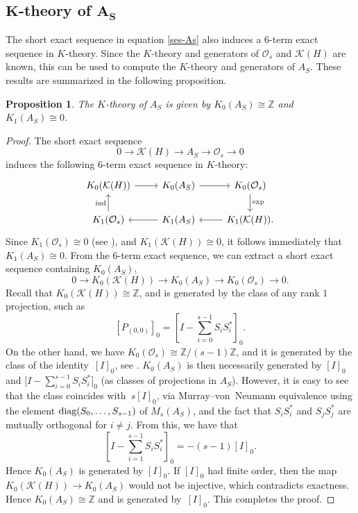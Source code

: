 \documentclass[pdftex]{sigma}
\newcommand{\Z}{{\mathbb Z}}
\numberwithin{equation}{section}
\newtheorem{Proposition}[Theorem]{Proposition}
 { \theoremstyle{definition}
\newtheorem{Definition}[Theorem]{Definition}
\newtheorem{Note}[Theorem]{Note}
\newtheorem{Example}[Theorem]{Example}
\newtheorem{Remark}[Theorem]{Remark} }
\begin{document}
\subsection[K-theory of A\_S]{$\boldsymbol{K}$-theory of $\boldsymbol{A_S}$}
The short exact sequence in equation \eqref{ses-As} also induces a $6$-term exact sequence in $K$-theory. Since the $K$-theory and generators of $\mathcal{O}_s$ and $\mathcal{K}(H)$ are known, this can be used to compute the $K$-theory and generators of $A_S$. These results are summarized in the following proposition.
\begin{Proposition}
The $K$-theory of $A_S$ is given by
$
K_0(A_S) \cong \Z$ and $ K_1(A_S) \cong 0$.
\end{Proposition}
\begin{proof}
The short exact sequence
\begin{equation*}
0\rightarrow\mathcal{K}(H)\rightarrow A_S\rightarrow\mathcal{O}_s\rightarrow 0
\end{equation*}
induces the following $6$-term exact sequence in $K$-theory:
\begin{equation*}
\begin{tikzcd}
 K_0(\mathcal{K}(H)) \arrow{r} & K_0(A_S) \arrow{r} & K_0(\mathcal{O}_s) \arrow{d}{\textup{exp}} \\
 K_1(\mathcal{O}_s) \arrow{u}{\textup{ind}} & K_1(A_S) \arrow{l} & K_1(\mathcal{K}(H)) \arrow{l}.
\end{tikzcd}
\end{equation*}
Since $K_1(\mathcal{O}_s) \cong 0$ (see \cite{Cu2}), and $K_1(\mathcal{K}(H)) \cong 0$, it follows immediately that
$K_1(A_S) \cong 0$.
From the $6$-term exact sequence, we can extract a short exact sequence containing $K_0(A_S)$,
\begin{equation*}
0 \to K_0(\mathcal{K}(H)) \to K_0(A_S) \to K_0(\mathcal{O}_s) \to 0.
\end{equation*}
Recall that $K_0(\mathcal{K}(H)) \cong \Z$, and is generated by the class of any rank $1$ projection, such as
\[
[P_{(0,0)}]_0 = \left[I - \sum_{i=0}^{s-1} S_iS_i^*\right]_0.
\]
On the other hand, we have
$K_0(\mathcal{O}_s) \cong \Z / (s-1) \Z$,
and it is generated by the class of the identity~$[I]_0$, see \cite{Cu2}. $K_0(A_S)$ is then necessarily generated by $[I]_0$ and $\big[I - \sum_{i=0}^{s-1} S_iS_i^*\big]_0$ (as classes of projections in $A_S$). However, it is easy to see that the class  coincides with~$s [I]_0$, via Murray--von~Neumann equivalence using the element $\textup{diag}(S_0, \dots , S_{s-1})$ of $M_s(A_S)$, and the fact that $S_iS_i^*$ and $S_jS_j^*$ are mutually orthogonal for $i \neq j$. From this, we have that
\begin{equation*}
\left[I - \sum_{i=1}^{s-1} S_iS_i^*\right]_0 = -(s-1)[I]_0.
\end{equation*}
Hence $K_0(A_S)$ is generated by $[I]_0$. If $[I]_0$ had finite order, then the map
$K_0(\mathcal{K}(H)) \to K_0(A_S)$
would not be injective, which contradicts exactness. Hence $K_0(A_S) \cong \Z$ and is generated by~$[I]_0$. This completes the proof.
\end{proof}
\end{document}
